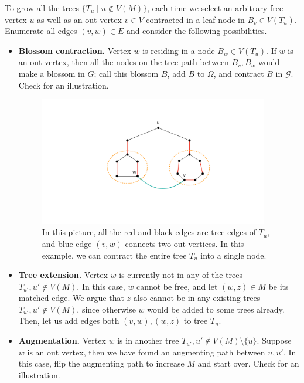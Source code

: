 To grow all the trees $\{T_u\mid u\notin V(M)\}$, each time we select an arbitrary free vertex $u$ as well as an out vertex $v\in V$ contracted in a leaf node in $B_v\in V(T_u)$. Enumerate all edges $(v, w)\in E$ and consider the following possibilities.
\begin{itemize}
	\item \textbf{Blossom contraction.} Vertex $w$ is residing in a node $B_w\in V(T_u)$. If $w$ is an out vertex, then all the nodes on the tree path between $B_v, B_w$ would make a blossom in $G$; call this blossom $B$, add $B$ to $\Omega$, and contract $B$ in $\mathcal{G}$. Check  for an illustration.
	
	\begin{figure}
		\centering
		\includegraphics[width=10cm]{fig/lecture_matching_contract}
		\caption{In this picture, all the red and black edges are tree edges of $T_u$, and blue edge $(v, w)$ connects two out vertices. In this example, we can contract the entire tree $T_u$ into a single node.}
		\label{fig:contract}
	\end{figure}
	
	\item \textbf{Tree extension.} Vertex $w$ is currently not in any of the trees $T_{u'}, u'\notin V(M)$. In this case, $w$ cannot be free, and let $(w, z)\in M$ be its matched edge. We argue that $z$ also cannot be in any existing trees $T_{u'}, u'\notin V(M)$, since otherwise $w$ would be added to some trees already. Then, let us add edges both $(v, w), (w, z)$ to tree $T_u$.
	
	\item \textbf{Augmentation.} Vertex $w$ is in another tree $T_{u'}, u'\notin V(M)\setminus \{u\}$. Suppose $w$ is an out vertex, then we have found an augmenting path between $u, u'$. In this case, flip the augmenting path to increase $M$ and start over. Check  for an illustration.
	

\end{itemize}
